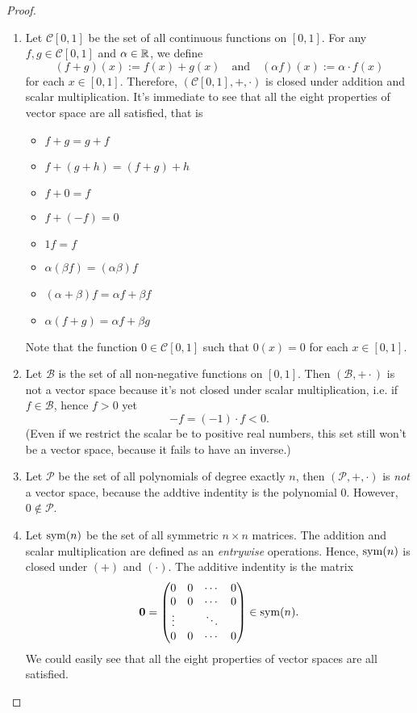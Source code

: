 \begin{proof}
  \text{}
  \begin{enumerate}
    \item Let $\mathcal{C}[0,1]$ be the set of all continuous functions
      on $[0,1]$. For any $f,g\in\mathcal{C}[0,1]$ and $\alpha\in\mathbb{R}$, we define
      \[
        (f+g)(x):=f(x)+g(x)
        \quad\text{and}\quad
        (\alpha f)(x):=\alpha\cdot f(x)
      \]
      for each $x\in[0,1]$. Therefore, $(\mathcal{C}[0,1], +,\cdot)$
      is closed under addition and scalar multiplication.
      It's immediate to see that all the eight properties of vector space
      are all satisfied, that is
      \begin{multicols}{2}
        \begin{itemize}
          \item $f+g=g+f$
          \item $f+(g+h)=(f+g)+h$
          \item $f+0=f$
          \item $f+(-f)=0$
          \item $1f=f$
          \item $\alpha(\beta f)=(\alpha\beta)f$
          \item $(\alpha+\beta)f=\alpha f+\beta f$
          \item $\alpha(f+g)=\alpha f+\beta g$
        \end{itemize}
      \end{multicols}
      Note that the function $0\in\mathcal{C}[0,1]$ such that
      $0(x)=0$ for each $x\in[0,1]$.
    \item Let $\mathcal{B}$ is the set of all non-negative functions on $[0,1]$.
      Then $(\mathcal{B},+\cdot)$ is not a vector space because it's not closed 
      under scalar multiplication, i.e. if $f\in\mathcal{B}$, hence $f>0$ yet
      \[-f=(-1)\cdot f<0.\]
      (Even if we restrict the scalar be to positive real numbers, this set 
      still won't be a vector space, because it fails to have an inverse.)
    \item Let $\mathcal{P}$ be the set of all polynomials of degree exactly $n$,
      then $(\mathcal{P}, +, \cdot)$ is \emph{not} a vector space, 
      because the addtive indentity is the polynomial 
      $0$. However, $0\notin\mathcal{P}$.
    \item Let $\operatorname{sym}(n)$ be the set of all symmetric $n\times n$ matrices. 
      The addition and scalar multiplication are defined as an
      \emph{entrywise} operations. Hence, $\operatorname{sym}(n)$ is closed under
      $(+)$ and $(\cdot)$. The additive indentity is the matrix 
      \[ \mathbf{0}=
        \begin{pmatrix}
          0&0&\cdots&0\\
          0&0&\cdots&0\\
          \vdots&&\ddots&\\
          0&0&\cdots&0
        \end{pmatrix}\in\operatorname{sym}(n).
      \]
      We could easily see that all the eight properties of vector spaces 
      are all satisfied.
  \end{enumerate}
\end{proof}
